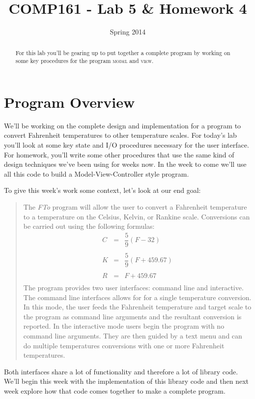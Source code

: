 \documentclass[]{tufte-handout}
\title{COMP161 - Lab 5 \& Homework 4}
\author{}
\date{Spring 2014}
\begin{document}
\maketitle

\begin{abstract}
For this lab you'll be gearing up to put together a complete program by working on some key procedures for the program \textsc{model} and \textsc{view}.
\end{abstract}

\section{Program Overview}

We'll be working on the complete design and implementation for a program to convert Fahrenheit temperatures to other temperature scales.  For today's lab you'll look at some key state and I/O procedures necessary for the user interface. For homework, you'll write some other procedures that use the same kind of design techniques we've been using for weeks now. In the week to come we'll use all this code to build a Model-View-Controller style program.

To give this week's work some context, let's look at our end goal:
\begin{framed}
\begin{quote}
The \textit{FTo} program will allow the user to convert a Fahrenheit temperature to a temperature on the Celsius, Kelvin, or Rankine scale. Conversions can be carried out using the following formulas:
\begin{equation*}
\begin{array}{rcl}
C &=& \dfrac{5}{9}(F-32)  \\ \\
K &=& \dfrac{5}{9}(F+459.67) \\ \\
R &=& F+459.67 \\
\end{array}
\end{equation*}
The program provides two user interfaces: command line and interactive.  The command line interfaces allows for for a single temperature conversion.  In this mode, the user feeds the Fahrenheit temperature and target scale to the program as command line arguments and the resultant conversion is reported.  In the interactive mode users begin the program with no command line arguments. They are then guided by a text menu and can do multiple temperatures conversions with one or more Fahrenheit temperatures. 
\end{quote}
\end{framed}
Both interfaces share a lot of functionality and therefore a lot of library code. We'll begin this week with the implementation of this library code and then next week explore how that code comes together to make a complete program. 
\end{document}
